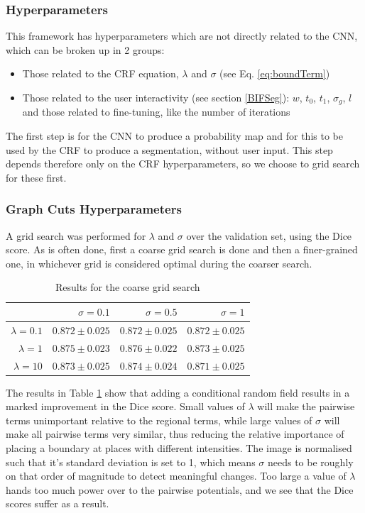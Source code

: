 \subsubsection{Hyperparameters}
This framework has hyperparameters which are not directly related to the CNN, which can be broken up in 2 groups:
\begin{itemize}
\item Those related to the CRF equation, $\lambda$ and $\sigma$ (see Eq. \ref{eq:boundTerm})
\item Those related to the user interactivity (see section \ref{BIFSeg}): $w$, $t_0$, $t_1$, $\sigma_g$, $l$ and those related to fine-tuning, like the number of iterations 
\end{itemize}
The first step is for the CNN to produce a probability map and for this to be used by the CRF to produce a segmentation, without user input. This step depends therefore only on the CRF hyperparameters, so we choose to grid search for these first.

\subsubsection{Graph Cuts Hyperparameters}
A grid search was performed for $\lambda$ and $\sigma$ over the validation set, using the Dice score. As is often done, first a coarse grid search is done and then a finer-grained one, in whichever grid is considered optimal during the coarser search.

\begin{table}[h!]
\centering
\begin{tabular}{|r|r|r|r|}
\hline
               & $\sigma = 0.1$    & $\sigma = 0.5$    & $\sigma=1$        \\ \hline
$\lambda=0.1$  & $0.872 \pm 0.025$ & $0.872 \pm 0.025$ & $0.872 \pm 0.025$ \\ \hline
$\lambda=1$    & $0.875 \pm 0.023$ & $0.876 \pm 0.022$ & $0.873 \pm 0.025$ \\ \hline
$\lambda=10$   & $0.873 \pm 0.025$ & $0.874 \pm 0.024$ & $0.871 \pm 0.025$ \\ \hline
\end{tabular}
\caption{Results for the coarse grid search}
\label{tab:gridCRF}
\end{table}

The results in Table \ref{tab:gridCRF} show that adding a conditional random field results in a marked improvement in the Dice score. Small values of $\lambda$ will make the pairwise terms unimportant relative to the regional terms, while large values of $\sigma$ will make all pairwise terms very similar, thus reducing the relative importance of placing a boundary at places with different intensities. The image is normalised such that it's standard deviation is set to 1, which means $\sigma$ needs to be roughly on that order of magnitude to detect meaningful changes. Too large a value of $\lambda$ hands too much power over to the pairwise potentials, and we see that the Dice scores suffer as a result.

